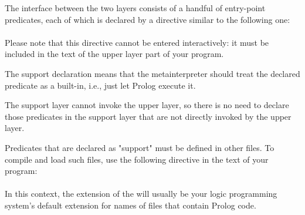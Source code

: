 The interface between the two layers consists of a handful of entry-point
predicates, each of which is  declared by a directive similar to the
following one:\\
\ind{}\\
Please note that this directive cannot be entered interactively: it must be
included in the text of the upper layer part of your program.

The support declaration means that the metainterpreter should treat the
declared predicate as a built-in, i.e., just let Prolog execute it.

The support layer cannot invoke the upper layer, so there is no need to
declare those predicates in the support layer that are not directly invoked
by the upper layer.

Predicates that are declared as "support" must be defined in other files.  To
compile and load such files, use the following directive in the text of your
program:\\
\ind{}\\

In this context, the extension of the  will usually be your
logic programming system's default extension for names of files that contain
Prolog code.%
%




